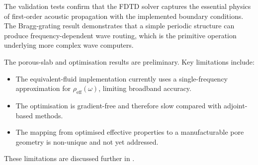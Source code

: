 The validation tests confirm that the FDTD solver captures the essential physics of first-order acoustic propagation with the implemented boundary conditions. The Bragg-grating result demonstrates that a simple periodic structure can produce frequency-dependent wave routing, which is the primitive operation underlying more complex wave computers.

The porous-slab and optimisation results are preliminary. Key limitations include:
\begin{itemize}
    \item The equivalent-fluid implementation currently uses a single-frequency approximation for $\rho_\mathrm{eff}(\omega)$, limiting broadband accuracy.
    \item The optimisation is gradient-free and therefore slow compared with adjoint-based methods.
    \item The mapping from optimised effective properties to a manufacturable pore geometry is non-unique and not yet addressed.
\end{itemize}

These limitations are discussed further in .
